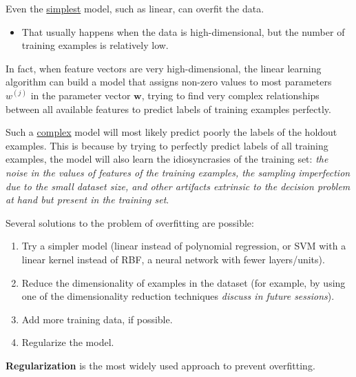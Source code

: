 \documentclass[8pt,dvipsnames]{beamer}
\begin{document}
\begin{frame}
	Even the \underline{simplest} model, such as linear, can overfit the data.
	\begin{itemize}
		\item That usually happens when the data is high-dimensional, but the number of training examples is relatively low.
	\end{itemize}
	In fact, when feature vectors are very high-dimensional, the linear learning algorithm can build a model that assigns non-zero values to most parameters $w^{(j)}$ in the parameter vector $\mathbf{w}$, trying to find very complex relationships between all available features to predict labels of training examples perfectly.

	Such a \underline{complex} model will most likely predict poorly the labels of the holdout examples. This is because by trying to perfectly predict labels of all training examples, the model will also learn the idiosyncrasies of the training set: \textit{the noise in the values of features of the training examples, the sampling imperfection due to the small dataset size, and other artifacts extrinsic to the decision problem at hand but present in the training set}.
\end{frame}

\begin{frame}
	Several solutions to the problem of overfitting are possible:
	\begin{enumerate}
		\item Try a simpler model (linear instead of polynomial regression, or SVM with a linear kernel instead of RBF, a neural network with fewer layers/units).
		\item Reduce the dimensionality of examples in the dataset (for example, by using one of the dimensionality reduction techniques \textit{discuss in future sessions}).
		\item Add more training data, if possible.
		\item Regularize the model.
	\end{enumerate}
	\textbf{Regularization} is the most widely used approach to prevent overfitting.
\end{frame}
\end{document}
